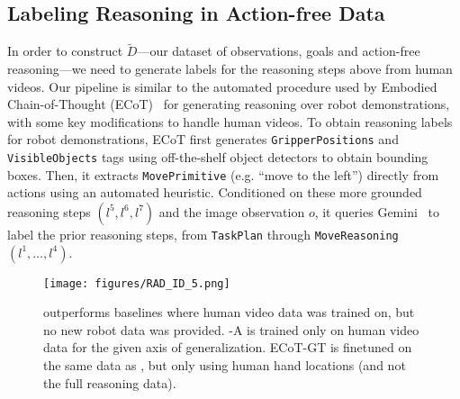 
\subsection{Labeling Reasoning in Action-free Data}\label{sec:method:labeling}



In order to construct $\tilde{D}$---our dataset of observations, goals and action-free reasoning---we need to generate labels for the reasoning steps above from human videos. Our pipeline is similar to the automated procedure used by Embodied Chain-of-Thought (ECoT)~\cite{zawalski2024robotic} for generating reasoning over robot demonstrations, with some key modifications to handle human videos.
To obtain reasoning labels for robot demonstrations, ECoT first generates \texttt{GripperPositions} and \texttt{VisibleObjects} tags using off-the-shelf object detectors to obtain bounding boxes. Then, it extracts \texttt{MovePrimitive} (e.g. ``move to the left'') directly from actions using an automated heuristic. Conditioned on these more grounded reasoning steps $(l^5, l^6, l^7)$ and the image observation $o$, it queries Gemini~\cite{team2023gemini} to label the prior reasoning steps, from \texttt{TaskPlan} through \texttt{MoveReasoning} $(l^1, \dots, l^4)$. %

\begin{figure*}[!ht]
    \centering
    \texttt{[image: figures/RAD\_ID\_5.png]}
    \caption{\ACRO outperforms baselines where human video data was trained on, but no new robot data was provided. \ACRO-A is \ACRO trained only on human video data for the given axis of generalization. ECoT-GT is finetuned on the same data as \ACRO, but only using human hand locations (and not the full reasoning data).}
    \label{fig:id_plot}
\end{figure*}

